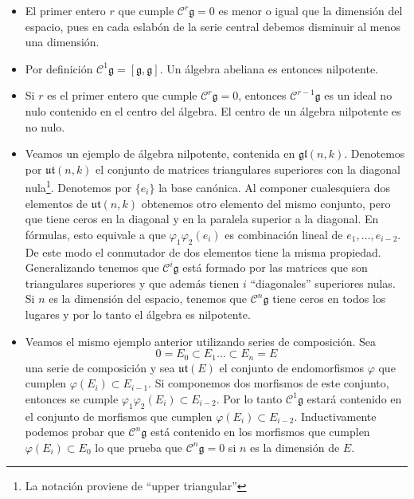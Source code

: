 \documentclass[a4paper,draft,12pt]{scrartcl}
\newcommand{\g}{\mathfrak{g}}%
\newcommand{\central}{\mathcal{C}}%
\begin{document}
\begin{itemize}

\item El primer entero $r$ que cumple $\central^r\g=0$ es menor o igual que la dimensión del espacio, pues en cada eslabón de la serie central debemos disminuir al menos  una dimensión.


\item Por definición $\central^1\g= [\g,\g]$.  Un álgebra abeliana es entonces nilpotente.



\item Si $r$ es el primer entero que cumple $\central^r\g=0$, entonces $\central^{r-1}\g$ es un ideal no nulo contenido en el centro del álgebra. El centro de un álgebra nilpotente es no nulo.



\item Veamos un ejemplo de álgebra nilpotente, contenida en $\mathfrak{gl}(n,k)$.  Denotemos por $\mathfrak{ut}(n,k)$ el conjunto de matrices triangulares superiores con la diagonal nula\footnote{La notación proviene de ``upper triangular''}.  Denotemos por $\{e_i\}$ la base canónica.  Al componer cualesquiera dos elementos de $\mathfrak{ut}(n,k)$ obtenemos otro elemento del mismo conjunto, pero que tiene ceros en la diagonal y en la paralela superior a la diagonal. 
  En fórmulas, esto equivale a que $\varphi_1\varphi_2(e_i)$ es combinación lineal de $e_1,\dots, e_{i-2}$. De este modo el conmutador de  dos elementos tiene  la misma propiedad.  Generalizando tenemos que $\central^i\g$ está formado por las matrices que son triangulares superiores y que además tienen $i$ ``diagonales'' superiores nulas.  Si $n$ es la dimensión del espacio, tenemos  que $\central^n\g$ tiene ceros en todos los lugares y por lo tanto el álgebra es nilpotente.
  
\item Veamos el mismo ejemplo anterior utilizando series de composición.  Sea 
$$
0=E_0\subset E_1 \dots \subset E_n=E
$$
una serie de composición y sea $\mathfrak{ut}(E)$ el conjunto de endomorfismos $\varphi$ que cumplen $\varphi(E_i)\subset E_{i-1}$.  Si componemos dos morfismos de este conjunto, entonces se cumple $\varphi_1 \varphi_2(E_i)\subset E_{i-2}$.  Por lo tanto $\central^1\g$ estará contenido en el conjunto de morfismos que cumplen $\varphi(E_i)\subset E_{i-2}$.  Inductivamente podemos probar que $\central^n\g$ está contenido en los morfismos que cumplen $\varphi(E_i) \subset E_0$ lo que  prueba que $\central^n\g=0$ si $n$ es la dimensión de $E$.

\end{itemize}
\end{document}
